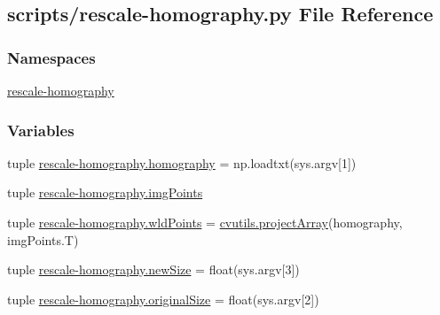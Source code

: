 \hypertarget{rescale-homography_8py}{\subsection{scripts/rescale-\/homography.py File Reference}
\label{rescale-homography_8py}
}
\subsubsection*{Namespaces}
\begin{DoxyCompactItemize}
\item 
\hyperlink{namespacerescale-homography}{rescale-\/homography}
\end{DoxyCompactItemize}
\subsubsection*{Variables}
\begin{DoxyCompactItemize}
\item 
tuple \hyperlink{namespacerescale-homography_a42ffc42ab732245a1523d5a509bb8b1a}{rescale-\/homography.\-homography} = np.\-loadtxt(sys.\-argv\mbox{[}1\mbox{]})
\item 
tuple \hyperlink{namespacerescale-homography_a75e8d0f1b7d28d78d256c46c4bf6ce55}{rescale-\/homography.\-img\-Points}
\item 
tuple \hyperlink{namespacerescale-homography_a1405968f6adcb1ca05fb4f1601d5a884}{rescale-\/homography.\-wld\-Points} = \hyperlink{namespacecvutils_a0ec21be4fe1491cec23252672d90564c}{cvutils.\-project\-Array}(homography, img\-Points.\-T)
\item 
tuple \hyperlink{namespacerescale-homography_a67c44d251f65d66939ff6006bfaa3d51}{rescale-\/homography.\-new\-Size} = float(sys.\-argv\mbox{[}3\mbox{]})
\item 
tuple \hyperlink{namespacerescale-homography_a0e5471c7a35e44f5da24c0384591940b}{rescale-\/homography.\-original\-Size} = float(sys.\-argv\mbox{[}2\mbox{]})
\end{DoxyCompactItemize}
